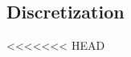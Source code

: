 \documentclass[preprint,12pt]{elsarticle}
\begin{document}
\begin{itemize}


\subsection{\textbf{Discretization}}
<<<<<<< HEAD
\label{subsec:exp-disc}


\end{itemize}
\end{document}

